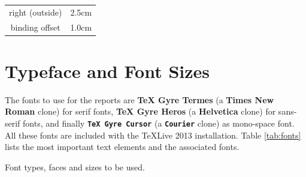 \documentclass[nofilelist]{cslthse-msc}
\begin{document}
\begin{appendices}
\begin{table}[!hbt]
\begin{tabular}{cc}
right (outside) & 2.5cm \\ 

binding offset & 1.0cm \\ 
\hline 
\end{tabular} 
\end{table}

\section{Typeface and Font Sizes}
The fonts to use for the reports are \textbf{TeX Gyre Termes} (a \textbf{Times New Roman} clone) for serif fonts, \textsf{\textbf{TeX Gyre Heros}} (a \textsf{\textbf{Helvetica}} clone) for sans-serif fonts, and finally \texttt{\textbf{TeX Gyre Cursor}} (a \texttt{\textbf{Courier}} clone) as mono-space font. All these fonts are included with the TeXLive 2013 installation. Table \ref{tab:fonts} lists the most important text elements and the associated fonts.
\begin{table}[!hbt]
\caption{Font types, faces and sizes to be used.}\label{tab:fonts}


\end{table}
\end{appendices}
\end{document}
